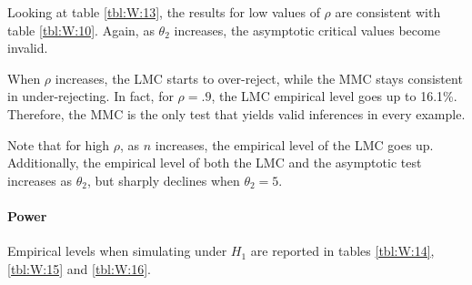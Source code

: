 \documentclass[]{article}\usepackage[]{graphicx}\usepackage[]{color}
\begin{document}
Looking at table \ref{tbl:W:13}, the results for low values of $\rho$ are consistent with table \ref{tbl:W:10}. Again, as $\theta_2$ increases, the asymptotic critical values become invalid.

When $\rho$ increases, the LMC starts to over-reject, while the MMC stays consistent in under-rejecting. In fact, for $\rho=.9$, the LMC empirical level goes up to 16.1\%. Therefore, the MMC is the only test that yields valid inferences in every example.

Note that for high $\rho$, as $n$ increases, the empirical level of the LMC goes up. Additionally, the empirical level of both the LMC and the asymptotic test increases as $\theta_2$, but sharply declines when $\theta_2=5$.

\paragraph{Power}

Empirical levels when simulating under $H_1$ are reported in tables \ref{tbl:W:14}, \ref{tbl:W:15} and \ref{tbl:W:16}.
\end{document}

